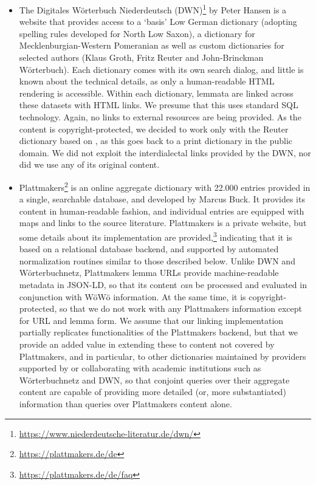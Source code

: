 \begin{itemize}
\item The Digitales Wörterbuch Niederdeutsch (DWN)\footnote{\url{https://www.niederdeutsche-literatur.de/dwn/}} by Peter Hansen is a website that provides access to a `basis' Low German dictionary (adopting spelling rules developed for North Low Saxon), a dictionary for Mecklenburgian-Western Pomeranian as well as custom dictionaries for selected authors (Klaus Groth, Fritz Reuter and John-Brinckman Wörterbuch). Each dictionary comes with its own search dialog, and little is known about the technical details, as only a human-readable HTML rendering is accessible. Within each dictionary, lemmata are linked across these datasets with HTML links. We presume that this uses standard SQL technology. Again, no links to external resources are being provided.
As the content is copyright-protected, we decided to work only with the Reuter dictionary based on \citep{muller1904reuter}, as this goes back to a print dictionary in the public domain. We did not exploit the interdialectal links provided by the DWN, nor did we use any of its original content.
\item Plattmakers\footnote{
    \url{https://plattmakers.de/de}
} is an online aggregate dictionary with 22.000 entries provided in a single, searchable database, and developed by Marcus Buck. It provides its content in human-readable fashion, and individual entries are equipped with maps and links to the source literature. Plattmakers is a private website, but some details about its implementation are provided,\footnote{\url{https://plattmakers.de/de/faq}} indicating that it is based on a relational database backend, and supported by automated normalization routines similar to those described below. Unlike DWN and Wörterbuchnetz, Plattmakers lemma URLs provide machine-readable metadata in JSON-LD, so that its content \emph{can} be processed and evaluated in conjunction with WöWö information. At the same time, it is copyright-protected, so that we do not work with any Plattmakers information except for URL and lemma form. %
We assume that our linking implementation partially replicates functionalities of the Plattmakers backend, but that we provide an added value in extending these to content not covered by Plattmakers, and in particular, to other dictionaries maintained by providers supported by or collaborating with academic institutions such as Wörterbuchnetz and DWN, so that conjoint queries over their aggregate content are capable of providing more detailed (or, more substantiated) information than queries over Plattmakers content alone.
\end{itemize}

